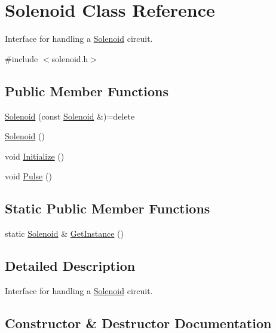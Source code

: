 \hypertarget{class_solenoid}{}\section{Solenoid Class Reference}
\label{class_solenoid}


Interface for handling a \hyperlink{class_solenoid}{Solenoid} circuit.  




{\ttfamily \#include $<$solenoid.\+h$>$}

\subsection*{Public Member Functions}
\begin{DoxyCompactItemize}
\item 
\hyperlink{class_solenoid_a6e9f8ce2b5b09ea3f587b83dc7c7ee36}{Solenoid} (const \hyperlink{class_solenoid}{Solenoid} \&)=delete
\item 
\hyperlink{class_solenoid_a786f920a2fdb2136f19ea02cbdc53555}{Solenoid} ()
\item 
void \hyperlink{class_solenoid_a6093fb381f87eee3e22c6dfc97f3fdc0}{Initialize} ()
\item 
void \hyperlink{class_solenoid_a50bc0121679bd1ff11323f1c88fe2ec6}{Pulse} ()
\end{DoxyCompactItemize}
\subsection*{Static Public Member Functions}
\begin{DoxyCompactItemize}
\item 
static \hyperlink{class_solenoid}{Solenoid} \& \hyperlink{class_solenoid_adc5bf799e0eb382eb6a5e4d471308f20}{Get\+Instance} ()
\end{DoxyCompactItemize}


\subsection{Detailed Description}
Interface for handling a \hyperlink{class_solenoid}{Solenoid} circuit. 

\subsection{Constructor \& Destructor Documentation}
\hypertarget{class_solenoid_a6e9f8ce2b5b09ea3f587b83dc7c7ee36}{}\label{class_solenoid_a6e9f8ce2b5b09ea3f587b83dc7c7ee36} 

